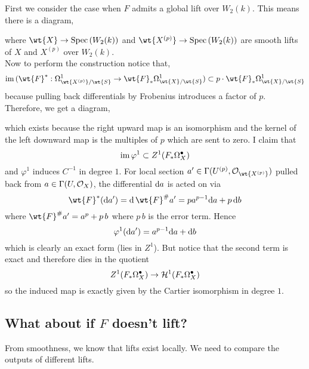 \documentclass[12pt]{article}
\begin{document}
First we consider the case when $F$ admits a global lift over $W_2(k)$. This means there is a diagram,
\begin{center}
\end{center}
where $\wt{X} \to \Spec{W_2(k)}$ and $\wt{X^{(p)}} \to \Spec{W_2(k)}$ are smooth lifts of $X$ and $X^{(p)}$ over $W_2(k)$. 
\bigskip\\
Now to perform the construction notice that,
\[ \im{(\wt{F}^* : \Omega^1_{\wt{X^{(p)}}/\wt{S}} \to \wt{F}_* \Omega^1_{\wt{X}/\wt{S}})} \subset p \cdot \wt{F}_* \Omega^1_{\wt{X}/\wt{S}} \]
because pulling back differentials by Frobenius introduces a factor of $p$. Therefore, we get a diagram,
\begin{center}
\end{center}
which exists because the right upward map is an isomorphism and the kernel of the left downward map is the multiples of $p$ which are sent to zero. 
I claim that
\[ \operatorname{\mathrm{im}}{\varphi^1} \subset Z^1(F_* \Omega^\bullet_{X}) \]
and $\varphi^1$ induces $C^{-1}$ in degree $1$. For local section $a'\in \Gamma(U^{(p)}, \struct{\wt{X^{(p)}}})$ pulled back from $a \in \Gamma(U, \mathcal{O}_{X})$, the differential $\mathrm{d}{a}$ is acted on via
\[ \wt{F}^*(\d{a'}) = \d{\,\wt{F}^\# a'} = p a^{p-1} \d{a} + p \, \d{b} \]
where $\wt{F}^\# a' = a^p + p \, b$ where $p \, b$ is the error term. Hence
\[ \varphi^1(\mathrm{d}{a'}) = a^{p-1} \mathrm{d}{a} + \mathrm{d}{b} \]
which is clearly an exact form (lies in $Z^1$). But notice that the second term is exact and therefore dies in the quotient
\[ Z^1(F_* \Omega^\bullet_{X}) \to \mathcal{H}^1(F_* \Omega^\bullet_{X}) \]
so the induced map is exactly given by the Cartier isomorphism in degree $1$.

\subsection{What about if $F$ doesn't lift?}

From smoothness, we know that lifts exist locally. We need to compare the outputs of different lifts. 
\end{document}
